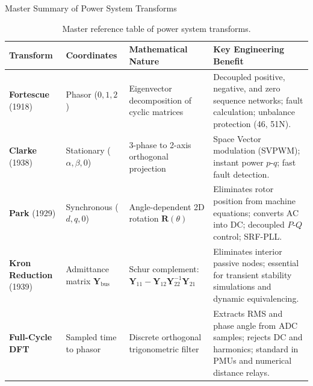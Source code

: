 \begin{frame}[shrink=12]{Master Summary of Power System Transforms}
    \begin{table}
        \centering
        \tiny
        \begin{tabularx}{\textwidth}{p{2.3cm} p{2.2cm} p{3.2cm} X}
            \toprule
            \textbf{Transform} & \textbf{Coordinates} & \textbf{Mathematical Nature} & \textbf{Key Engineering Benefit} \\
            \midrule
            \textbf{Fortescue} (1918) & Phasor ($0, 1, 2$) & Eigenvector decomposition of cyclic matrices & Decoupled positive, negative, and zero sequence networks; fault calculation; unbalance protection (46, 51N). \\
            \addlinespace
            \textbf{Clarke} (1938) & Stationary ($\alpha, \beta, 0$) & 3-phase to 2-axis orthogonal projection & Space Vector modulation (SVPWM); instant power $p\text{-}q$; fast fault detection. \\
            \addlinespace
            \textbf{Park} (1929) & Synchronous ($d, q, 0$) & Angle-dependent 2D rotation $\mathbf{R}(\theta)$ & Eliminates rotor position from machine equations; converts AC into DC; decoupled $P\text{-}Q$ control; SRF-PLL. \\
            \addlinespace
            \textbf{Kron Reduction} (1939) & Admittance matrix $\mathbf{Y}_{\text{bus}}$ & Schur complement: $\mathbf{Y}_{11} - \mathbf{Y}_{12}\mathbf{Y}_{22}^{-1}\mathbf{Y}_{21}$ & Eliminates interior passive nodes; essential for transient stability simulations and dynamic equivalencing. \\
            \addlinespace
            \textbf{Full-Cycle DFT} & Sampled time to phasor & Discrete orthogonal trigonometric filter & Extracts RMS and phase angle from ADC samples; rejects DC and harmonics; standard in PMUs and numerical distance relays. \\
            \bottomrule
        \end{tabularx}
        \caption{Master reference table of power system transforms.}
    \end{table}
\end{frame}

